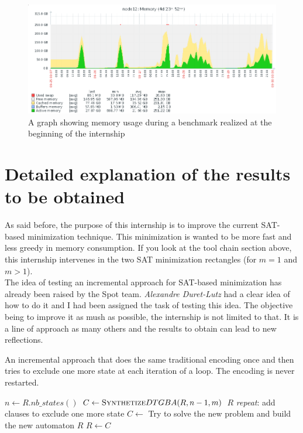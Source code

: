\begin{figure}[h]
 \centering
 \includegraphics[scale=0.5]{img/over_memory.png}
 \caption{A graph showing memory usage during a benchmark realized at the beginning of the internship}
 \label{fig:over_memory}
\end{figure}

\section{Detailed explanation of the results to be obtained}
As said before, the purpose of this internship is to improve the current SAT-based minimization technique.
This minimization is wanted to be more fast and less greedy in memory consumption.
If you look at the tool chain section above, this internship intervenes in the two SAT minimization
rectangles (for $m=1$ and $m > 1$).\\

The idea of testing an incremental approach for SAT-based minimization has already been raised by the Spot
team. \textit{Alexandre Duret-Lutz} had a clear idea of how to do it and I had been assigned the task of
testing this idea. The objective being to improve it as mush as possible, the internship is not limited
to that. It is a line of approach as many others and the results to obtain can lead to new reflections.\\

\begin{algorithm}[H]
 \caption{An incremental approach that does the same traditional encoding once and then tries to exclude
          one more state at each iteration of a loop. The encoding is never restarted.}\label{naive}
 \begin{algorithmic}[1]
   \State $n \gets R.nb\_states() $
   \State $C \gets \textsc{Synthetize}DTGBA(R,n-1,m) $
    \Return $R$\EndIf
   \BState \emph{repeat}:
   \State add clauses to exclude one more state
   \State $C \gets$ Try to solve the new problem and build the new automaton
    \Return $R$\EndIf
   \State $R \gets C$
  \EndProcedure
 \end{algorithmic}
\end{algorithm}


